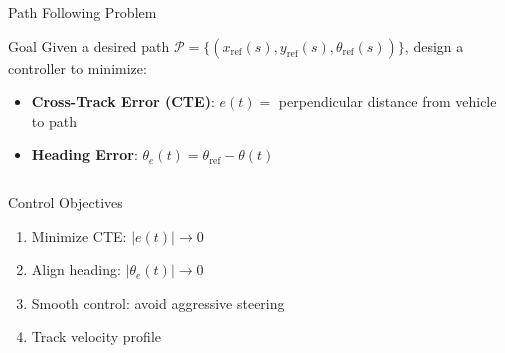 \documentclass[10pt]{beamer}
\begin{document}
\begin{frame}{Path Following Problem}
  \begin{block}{Goal}
    Given a desired path $\mathcal{P} = \{(x_{\text{ref}}(s), y_{\text{ref}}(s), \theta_{\text{ref}}(s))\}$, design a controller to minimize:
  \end{block}

  \begin{itemize}
    \item \textbf{Cross-Track Error (CTE)}: $e(t) = $ perpendicular distance from vehicle to path
    \item \textbf{Heading Error}: $\theta_e(t) = \theta_{\text{ref}} - \theta(t)$
  \end{itemize}

  \vspace{0.3cm}

  \begin{columns}[c]
    \begin{block}{Control Objectives}
      \begin{enumerate}
        \item Minimize CTE: $|e(t)| \to 0$
        \item Align heading: $|\theta_e(t)| \to 0$
        \item Smooth control: avoid aggressive steering
        \item Track velocity profile
      \end{enumerate}
    \end{block}

    \begin{center}
    \end{center}
  \end{columns}
\end{frame}
\end{document}

